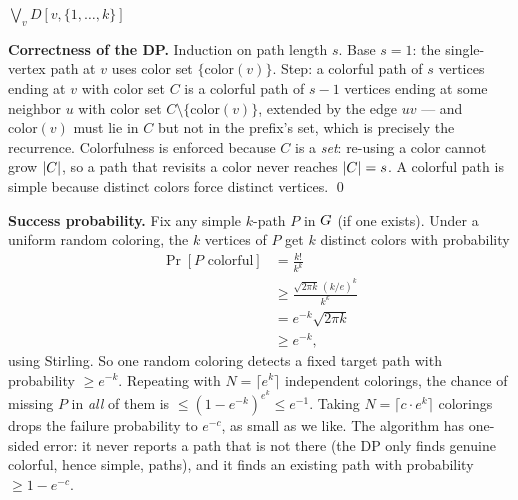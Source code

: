 \begin{algorithm}[H]
\caption{\textsc{ColorfulPath}$(\Gph,k,\mathrm{color})$ --- DP over color subsets}
\label{ch25:alg-colorcoding}
\DontPrintSemicolon
{}
\Return $\bigvee_{v} D[v,\{1,\dots,k\}]$\;
\end{algorithm}

\begin{whybox}
\textbf{Correctness of the DP.} Induction on path length $s$. Base $s=1$: the single-vertex path at $v$ uses color set $\{\mathrm{color}(v)\}$. Step: a colorful path of $s$ vertices ending at $v$ with color set $C$ is a colorful path of $s-1$ vertices ending at some neighbor $u$ with color set $C\setminus\{\mathrm{color}(v)\}$, extended by the edge $uv$ --- and $\mathrm{color}(v)$ must lie in $C$ but not in the prefix's set, which is precisely the recurrence. Colorfulness is enforced because $C$ is a \emph{set}: re-using a color cannot grow $\lvert C\rvert$, so a path that revisits a color never reaches $\lvert C\rvert=s$. A colorful path is simple because distinct colors force distinct vertices. \qed
\end{whybox}

\begin{whybox}
\textbf{Success probability.} Fix any simple $k$-path $P$ in $G$ (if one exists). Under a uniform random coloring, the $k$ vertices of $P$ get $k$ distinct colors with probability
\begin{align*}
  \Pr[P\text{ colorful}] &= \frac{k!}{k^k} \\
  &\ge \frac{\sqrt{2\pi k}\,(k/e)^k}{k^k} \\
  &= e^{-k}\sqrt{2\pi k} \\
  &\ge e^{-k},
\end{align*}
using Stirling. So one random coloring detects a fixed target path with probability $\ge e^{-k}$. Repeating with $N = \lceil e^k\rceil$ independent colorings, the chance of missing $P$ in \emph{all} of them is $\le (1-e^{-k})^{e^k}\le e^{-1}$. Taking $N = \lceil c\cdot e^k\rceil$ colorings drops the failure probability to $e^{-c}$, as small as we like. The algorithm has one-sided error: it never reports a path that is not there (the DP only finds genuine colorful, hence simple, paths), and it finds an existing path with probability $\ge 1-e^{-c}$.
\end{whybox}

